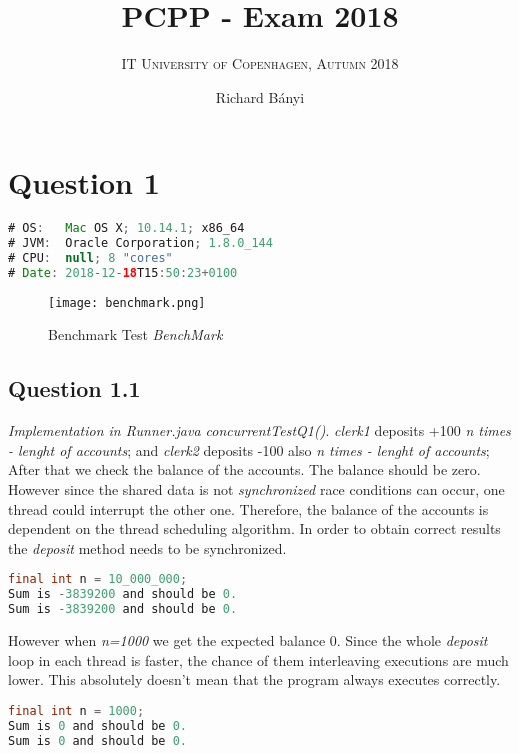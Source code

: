 \documentclass[format=acmsmall, review=false, screen=true]{acmart}
\author{Richard Bányi}
\title{\textsc{PCPP} - Exam 2018}
\subtitle{\textsc{IT University of Copenhagen, Autumn 2018}}
\begin{document}
\maketitle

\section{Question 1}

\begin{lstlisting}[language=java]
# OS:   Mac OS X; 10.14.1; x86_64
# JVM:  Oracle Corporation; 1.8.0_144
# CPU:  null; 8 "cores"
# Date: 2018-12-18T15:50:23+0100
\end{lstlisting}

\begin{figure}[H]
  \texttt{[image: benchmark.png]}
  \caption{Benchmark Test \textit{BenchMark}}
  \label{fig:benchmark}
\end{figure}

\subsection{Question 1.1}

\textit{Implementation in Runner.java concurrentTestQ1(){}}. \emph{clerk1} deposits +100 \emph{n times - lenght of accounts}; and \emph{clerk2} deposits -100 also \emph{n times - lenght of accounts}; After that we check the balance of the accounts. The balance should be zero. However since the shared data is not \emph{synchronized} race conditions can occur, one thread could interrupt the other one. Therefore, the balance of the accounts is dependent on the thread scheduling algorithm. In order to obtain correct results the \emph{deposit} method needs to be synchronized.

\begin{lstlisting}[language=java]
final int n = 10_000_000;
Sum is -3839200 and should be 0.
Sum is -3839200 and should be 0.
\end{lstlisting}

However when \emph{n=1000} we get the expected balance 0. Since the whole \emph{deposit} loop in each thread is faster, the chance of them interleaving executions are much lower. This absolutely doesn't mean that the program always executes correctly.

\begin{lstlisting}[language=java]
final int n = 1000;
Sum is 0 and should be 0.
Sum is 0 and should be 0.
\end{lstlisting}
\end{document}
